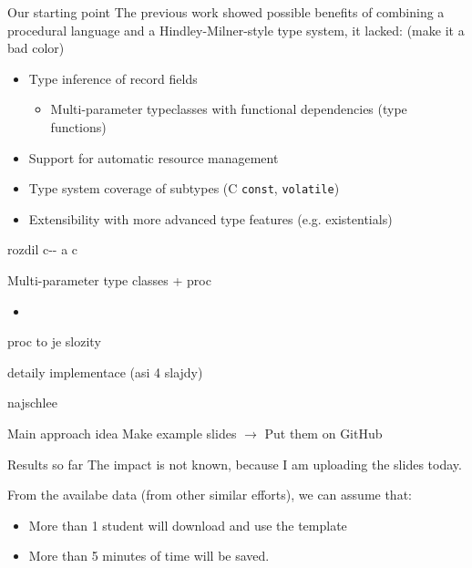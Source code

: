 \documentclass[aspectratio=169]{beamer}
\newcommand{\xxx}[1]{\textcolor{red!}{#1}}
\begin{document}
\begin{frame}{Our starting point}
  The previous work showed possible benefits of combining a procedural language and a Hindley-Milner-style type system, it lacked: (\xxx{make it a bad color})

  \begin{itemize}
    \item Type inference of record fields
    \begin{itemize}
      \item Multi-parameter typeclasses with functional dependencies (type functions)
    \end{itemize}
    \item Support for automatic resource management
    \item Type system coverage of subtypes (C \lstinline{const}, \lstinline{volatile})
    \item Extensibility with more advanced type features (e.g. existentials)
  \end{itemize}
\end{frame}

\begin{frame}{rozdil c-{}- a c}
\end{frame}

\begin{frame}{Multi-parameter type classes + proc}
  \begin{itemize}
    \item 
  \end{itemize}
\end{frame}

\begin{frame}{proc to je slozity}
\end{frame}

\begin{frame}{detaily implementace (asi 4 slajdy)}
\end{frame}

\begin{frame}{najschlee}
\end{frame}

\begin{frame}[standout]{Main approach idea}
Make example slides
$\to$
Put them on GitHub
\end{frame}

\begin{frame}{Results so far}
The impact is not known, because I am uploading the slides today.

\pause
From the availabe data (from other similar efforts), we can assume that:
\begin{itemize}
\item \alert<2>{More than 1 student will download and use the template}
\item \alert<3>{More than 5 minutes of time will be saved.} 
\end{itemize}
\end{frame}
\end{document}

